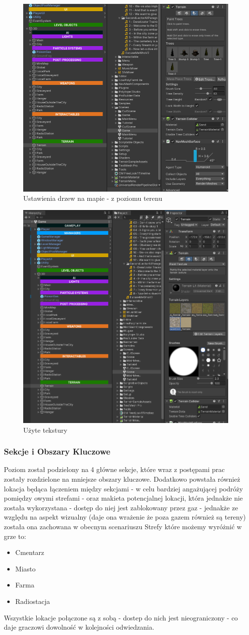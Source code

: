 \begin{figure}[h!]
    \centering
    \includegraphics[width=0.65\linewidth]{Images/terrain.png}
    \caption{Ustawienia drzew na mapie - z poziomu terenu}
    \label{fig:enter-label}
\end{figure}
\begin{figure}[h!]
    \centering
    \includegraphics[width=0.65\linewidth]{Images/image.png}
    \caption{Użyte tekstury}
    \label{fig:enter-label}
\end{figure}
\newpage
\subsubsection{Sekcje i Obszary Kluczowe}
Poziom został podzielony na 4 główne sekcje, które wraz z postępami prac zostały rozdzielone na mniejsze obszary kluczowe.
Dodatkowo powstała również lokacja będąca łączeniem między sekcjami - w celu bardziej angażującej podróży pomiędzy owymi strefami - oraz makieta potencjalnej lokacji, która jednakże nie została wykorzystana - dostęp do niej jest zablokowany przez gaz - jednakże ze względu na aspekt wizualny (daje ona wrażenie że poza gazem również są tereny) została ona zachowana w obecnym scenariuszu
Strefy które możemy wyróżnić w grze to:
\begin{itemize}
    \item Cmentarz
    \item Miasto
    \item Farma
    \item Radiostacja
\end{itemize}
Wszystkie lokacje połączone są z sobą - dostep do nich jest nieograniczony - co daje graczowi dowolność w kolejności odwiedzania.

